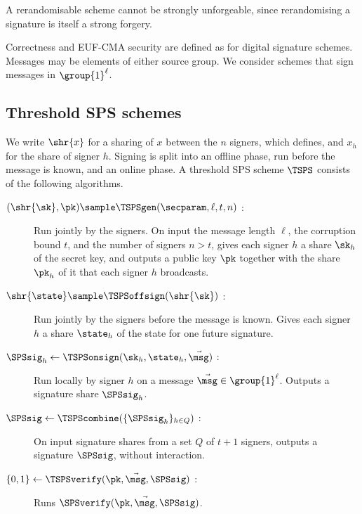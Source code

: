 A rerandomisable scheme cannot be strongly unforgeable, since rerandomising a
signature is itself a strong forgery.

Correctness and EUF-CMA security are defined as for digital signature schemes.
Messages may be elements of either source group. We consider schemes that sign
messages in $\group{1}^\ell$.

\subsection{Threshold SPS schemes}

We write $\shr{x}$ for a sharing of $x$ between the $n$ signers, which
 defines, and $x_h$ for
the share of signer $h$. Signing is split
into an offline phase, run before the message is known, and an online phase. A
threshold SPS scheme $\TSPS$ consists of the following algorithms.

\begin{description}

  \item[{$(\shr{\sk}, \pk) \sample \TSPSgen(\secparam, \ell, t, n)$ :}] Run
jointly by the signers. On input the message length $\ell$, the corruption bound
$t$, and the number of signers $n > t$, gives each signer $h$ a share $\sk_h$
of the secret key, and outputs a public key $\pk$ together with the share
$\pk_h$ of it that each signer $h$ broadcasts.

  \item[{$\shr{\state} \sample \TSPSoffsign(\shr{\sk})$ :}] Run jointly by the
signers before the message is known. Gives each signer $h$ a share $\state_h$ of
the state for one future signature.

  \item[{$\SPSsig_h \leftarrow \TSPSonsign(\sk_h, \state_h, \vec{\msg})$ :}] Run
locally by signer $h$ on a message $\vec{\msg} \in \group{1}^\ell$. Outputs a
signature share $\SPSsig_h$.

  \item[{$\SPSsig \leftarrow \TSPScombine(\{\SPSsig_h\}_{h \in Q})$ :}] On input
signature shares from a set $Q$ of $t+1$ signers, outputs a signature
$\SPSsig$, without interaction.

  \item[$\{0,1\} \leftarrow \TSPSverify(\pk, \vec{\msg}, \SPSsig)$ :] Runs
$\SPSverify(\pk, \vec{\msg}, \SPSsig)$.

\end{description}

